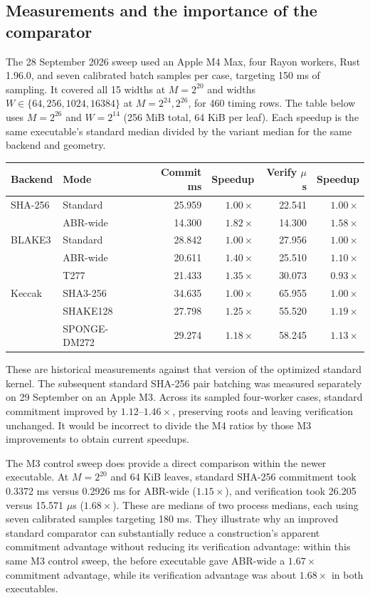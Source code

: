 \documentclass[11pt,letterpaper]{article}
\theoremstyle{definition} %
\begin{document}
\subsection{Measurements and the importance of the comparator}
The 28 September 2026 sweep used an Apple M4 Max, four Rayon workers,
Rust 1.96.0, and seven calibrated batch samples per case, targeting
150 ms of sampling. It covered all 15 widths at $M=2^{20}$ and widths
$W\in\{64,256,1024,16384\}$ at $M=2^{24},2^{26}$, for 460 timing rows.
The table below uses $M=2^{26}$ and $W=2^{14}$ (256 MiB total, 64 KiB
per leaf). Each speedup is the same executable's standard median divided
by the variant median for the same backend and geometry.

\begin{center}
\small
\setlength{\tabcolsep}{5pt}
\begin{tabular}{@{}llrrrr@{}}
\toprule
Backend & Mode & Commit ms & Speedup & Verify $\mu$s & Speedup\\
\midrule
SHA-256 & Standard & 25.959 & $1.00\times$ & 22.541 & $1.00\times$\\
 & ABR-wide & 14.300 & $1.82\times$ & 14.300 & $1.58\times$\\
BLAKE3 & Standard & 28.842 & $1.00\times$ & 27.956 & $1.00\times$\\
 & ABR-wide & 20.611 & $1.40\times$ & 25.510 & $1.10\times$\\
 & T277 & 21.433 & $1.35\times$ & 30.073 & $0.93\times$\\
Keccak & SHA3-256 & 34.635 & $1.00\times$ & 65.955 & $1.00\times$\\
 & SHAKE128 & 27.798 & $1.25\times$ & 55.520 & $1.19\times$\\
 & SPONGE-DM272 & 29.274 & $1.18\times$ & 58.245 & $1.13\times$\\
\bottomrule
\end{tabular}
\end{center}
These are historical measurements against that version of the optimized
standard kernel. The subsequent standard SHA-256 pair batching was measured
separately on 29 September on an Apple M3. Across its sampled four-worker
cases, standard commitment improved by $1.12$--$1.46\times$, preserving
roots and leaving verification unchanged. It would be incorrect to divide
the M4 ratios by those M3 improvements to obtain current speedups.

The M3 control sweep does provide a direct comparison within the newer
executable. At $M=2^{20}$ and 64 KiB leaves, standard SHA-256 commitment
took 0.3372 ms versus 0.2926 ms for ABR-wide ($1.15\times$), and
verification took 26.205 versus 15.571 $\mu$s ($1.68\times$).
These are medians of two process medians, each using seven calibrated
samples targeting 180 ms. They illustrate why an improved standard
comparator can substantially reduce a construction's apparent commitment
advantage without reducing its verification advantage: within this same
M3 control sweep, the before executable gave ABR-wide a $1.67\times$
commitment advantage, while its verification advantage was about
$1.68\times$ in both executables.
\end{document}
